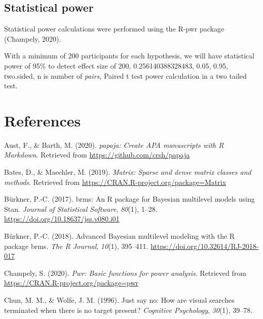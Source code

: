 \documentclass[
  english,
  man]{apa6}
\begin{document}
\hypertarget{statistical-power}{%
\subsection{Statistical power}\label{statistical-power}}

Statistical power calculations were performed using the R-pwr package (Champely, 2020).

With a minimum of 200 participants for each hypothesis, we will have statistical power of 95\% to detect effect size of 200, 0.256140388328483, 0.05, 0.95, two.sided, n is number of \emph{pairs}, Paired t test power calculation in a two tailed test.

\newpage

\hypertarget{references}{%
\section{References}\label{references}}

\begingroup
\setlength{\parindent}{-0.5in}
\setlength{\leftskip}{0.5in}

\hypertarget{refs}{}
\leavevmode\hypertarget{ref-R-papaja}{}%
Aust, F., \& Barth, M. (2020). \emph{papaja: Create APA manuscripts with R Markdown}. Retrieved from \url{https://github.com/crsh/papaja}

\leavevmode\hypertarget{ref-R-Matrix}{}%
Bates, D., \& Maechler, M. (2019). \emph{Matrix: Sparse and dense matrix classes and methods}. Retrieved from \url{https://CRAN.R-project.org/package=Matrix}

\leavevmode\hypertarget{ref-R-brms_a}{}%
Bürkner, P.-C. (2017). brms: An R package for Bayesian multilevel models using Stan. \emph{Journal of Statistical Software}, \emph{80}(1), 1--28. \url{https://doi.org/10.18637/jss.v080.i01}

\leavevmode\hypertarget{ref-R-brms_b}{}%
Bürkner, P.-C. (2018). Advanced Bayesian multilevel modeling with the R package brms. \emph{The R Journal}, \emph{10}(1), 395--411. \url{https://doi.org/10.32614/RJ-2018-017}

\leavevmode\hypertarget{ref-R-pwr}{}%
Champely, S. (2020). \emph{Pwr: Basic functions for power analysis}. Retrieved from \url{https://CRAN.R-project.org/package=pwr}

\leavevmode\hypertarget{ref-chun1996just}{}%
Chun, M. M., \& Wolfe, J. M. (1996). Just say no: How are visual searches terminated when there is no target present? \emph{Cognitive Psychology}, \emph{30}(1), 39--78.
\end{document}
